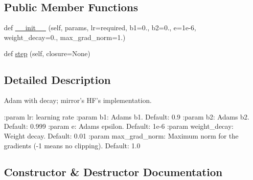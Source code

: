 \subsection*{Public Member Functions}
\begin{DoxyCompactItemize}
\item 
def \hyperlink{classparlai_1_1agents_1_1bert__ranker_1_1helpers_1_1AdamWithDecay_a23ec68b6a5fa73936194b9d1acde8557}{\+\_\+\+\_\+init\+\_\+\+\_\+} (self, params, lr=required, b1=0., b2=0., e=1e-\/6, weight\+\_\+decay=0., max\+\_\+grad\+\_\+norm=1.)
\item 
def \hyperlink{classparlai_1_1agents_1_1bert__ranker_1_1helpers_1_1AdamWithDecay_aeb41188377c1a61b4638228abd6c3e64}{step} (self, closure=None)
\end{DoxyCompactItemize}


\subsection{Detailed Description}
\begin{DoxyVerb}Adam with decay; mirror's HF's implementation.

:param lr:
    learning rate
:param b1:
    Adams b1. Default: 0.9
:param b2:
    Adams b2. Default: 0.999
:param e:
    Adams epsilon. Default: 1e-6
:param weight_decay:
    Weight decay. Default: 0.01
:param max_grad_norm:
    Maximum norm for the gradients (-1 means no clipping).  Default: 1.0
\end{DoxyVerb}
 

\subsection{Constructor \& Destructor Documentation}
\mbox{\label{classparlai_1_1agents_1_1bert__ranker_1_1helpers_1_1AdamWithDecay_a23ec68b6a5fa73936194b9d1acde8557}} 
